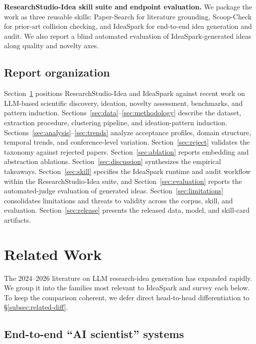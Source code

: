 \documentclass[10pt,a4paper]{article}
\begin{document}
\textbf{ResearchStudio-Idea skill suite and endpoint evaluation.} We package the work as three reusable skills: Paper-Search for literature grounding, Scoop-Check for prior-art collision checking, and IdeaSpark for end-to-end idea generation and audit. We also report a blind automated evaluation of IdeaSpark-generated ideas along quality and novelty axes.

\subsection{Report organization}

Section~\ref{sec:related} positions ResearchStudio-Idea and IdeaSpark against recent work on LLM-based scientific discovery, ideation, novelty assessment, benchmarks, and pattern induction. Sections~\ref{sec:data}--\ref{sec:methodology} describe the dataset, extraction procedure, clustering pipeline, and ideation-pattern induction. Sections~\ref{sec:analysis}--\ref{sec:trends} analyze acceptance profiles, domain structure, temporal trends, and conference-level variation. Section~\ref{sec:reject} validates the taxonomy against rejected papers. Section~\ref{sec:ablation} reports embedding and abstraction ablations. Section~\ref{sec:discussion} synthesizes the empirical takeaways. Section~\ref{sec:skill} specifies the IdeaSpark runtime and audit workflow within the ResearchStudio-Idea suite, and Section~\ref{sec:evaluation} reports the automated-judge evaluation of generated ideas. Section~\ref{sec:limitations} consolidates limitations and threats to validity across the corpus, skill, and evaluation. Section~\ref{sec:release} presents the released data, model, and skill-card artifacts.

\section{Related Work}
\label{sec:related}

The 2024--2026 literature on LLM research-idea generation has expanded rapidly. We group it into the families most relevant to IdeaSpark and survey each below. To keep the comparison coherent, we defer direct head-to-head differentiation to \S\ref{subsec:related-diff}.

\subsection{End-to-end ``AI scientist'' systems}
\label{subsec:related-scientist}
\end{document}
